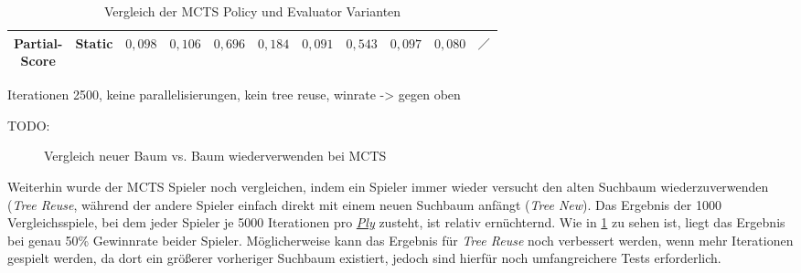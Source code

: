 \begin{table}[H]
{\begin{tabular}{|c|c|c|c|c|c|c|c|c|c|c|}
            \tiny \makecell{Partial-                                                                                                                                                                                                                                                                                                                                                              \\Score} &        Static & \cellcolor[HTML]{f9826f}$0{,}098$ & \cellcolor[HTML]{f98470}$0{,}106$ & \cellcolor[HTML]{c2da81}$0{,}696$ & \cellcolor[HTML]{fa9874}$0{,}184$ & \cellcolor[HTML]{f9806f}$0{,}091$ & \cellcolor[HTML]{f2e884}$0{,}543$ & \cellcolor[HTML]{f9826f}$0{,}097$ & \cellcolor[HTML]{f97d6e}$0{,}080$ & $\diagup$                         \\ \hline
        \end{tabular}}
    \vspace{3pt}
    \caption{Vergleich der \acs{MCTS} Policy und Evaluator Varianten}
    \label{tabelle:mcts-policy-eval-comparision}
\end{table}

Iterationen 2500, keine parallelisierungen, kein tree reuse, winrate -> gegen oben

TODO:

\begin{figure}[!ht]
    \centering
    \caption[Vergleich Baumwiederverwendung bei MCTS]{Vergleich neuer Baum vs. Baum wiederverwenden bei \acs{MCTS}}
    \label{fig:mcts-tree-reuse-comparision}
\end{figure}

Weiterhin wurde der \ac{MCTS} Spieler noch vergleichen, indem ein Spieler immer wieder versucht den alten Suchbaum wiederzuverwenden (\emph{Tree Reuse}, während der andere Spieler einfach direkt mit einem neuen Suchbaum anfängt (\emph{Tree New}). Das Ergebnis der 1000 Vergleichsspiele, bei dem jeder Spieler je 5000 Iterationen pro \hyperref[text:ply]{\emph{Ply}} zusteht, ist relativ ernüchternd. Wie in \ref{fig:mcts-tree-reuse-comparision} zu sehen ist, liegt das Ergebnis bei genau 50\% Gewinnrate beider Spieler. Möglicherweise kann das Ergebnis für \emph{Tree Reuse} noch verbessert werden, wenn mehr Iterationen gespielt werden, da dort ein größerer vorheriger Suchbaum existiert, jedoch sind hierfür noch umfangreichere Tests erforderlich.

